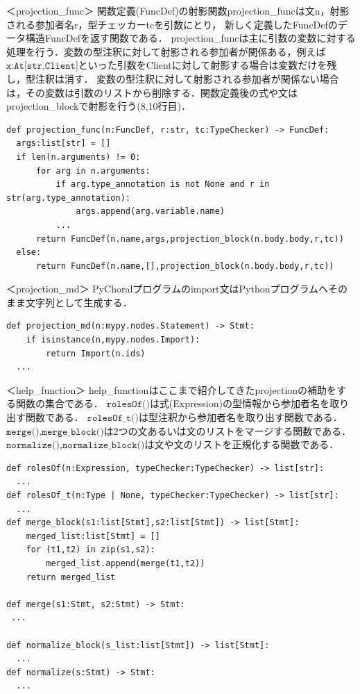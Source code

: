 \documentclass{thesis}
\begin{document}
＜projection\_func＞
関数定義(FuncDef)の射影関数projection\_funcは文\textsf{n}，射影される参加者名\textsf{r}，型チェッカー\textsf{tc}を引数にとり， 新しく定義したFuncDefのデータ構造\textsf{FuncDef}を返す関数である．
projection\_funcは主に引数の変数に対する処理を行う．変数の型注釈に対して射影される参加者が関係ある，例えば$\texttt{x:At[str,Client]}$といった引数をClientに対して射影する場合は変数だけを残し，型注釈は消す．
変数の型注釈に対して射影される参加者が関係ない場合は，その変数は引数のリストから削除する．関数定義後の式や文はprojection\_blockで射影を行う(8,10行目)．
\begin{lstlisting}[caption=pro\_func.py]
def projection_func(n:FuncDef, r:str, tc:TypeChecker) -> FuncDef:
  args:list[str] = []
  if len(n.arguments) != 0:
      for arg in n.arguments:
          if arg.type_annotation is not None and r in str(arg.type_annotation):
              args.append(arg.variable.name)
          ... 
      return FuncDef(n.name,args,projection_block(n.body.body,r,tc))
  else:
      return FuncDef(n.name,[],projection_block(n.body.body,r,tc))
\end{lstlisting}
＜projection\_md＞
PyChoralプログラムのimport文はPythonプログラムへそのまま文字列として生成する．
\begin{lstlisting}[caption=pro\_md.py]
def projection_md(n:mypy.nodes.Statement) -> Stmt:
    if isinstance(n,mypy.nodes.Import):
        return Import(n.ids)
  ... 
\end{lstlisting}
＜help\_function＞
help\_functionはここまで紹介してきたprojectionの補助をする関数の集合である．
$\texttt{rolesOf()}$は式(\textsf{Expression})の型情報から参加者名を取り出す関数である．
$\texttt{rolesOf\_t()}$は型注釈から参加者名を取り出す関数である．
$\texttt{merge(),merge\_block()}$は2つの文あるいは文のリストをマージする関数である．
$\texttt{normalize(),normalize\_block()}$は文や文のリストを正規化する関数である．
\begin{lstlisting}[caption=help\_func.py]
def rolesOf(n:Expression, typeChecker:TypeChecker) -> list[str]:
  ... 
def rolesOf_t(n:Type | None, typeChecker:TypeChecker) -> list[str]:
  ... 
def merge_block(s1:list[Stmt],s2:list[Stmt]) -> list[Stmt]:
    merged_list:list[Stmt] = []
    for (t1,t2) in zip(s1,s2):
        merged_list.append(merge(t1,t2))
    return merged_list

def merge(s1:Stmt, s2:Stmt) -> Stmt: 
 ... 

def normalize_block(s_list:list[Stmt]) -> list[Stmt]:
  ... 
def normalize(s:Stmt) -> Stmt:
  ... 
\end{lstlisting}
\end{document}
